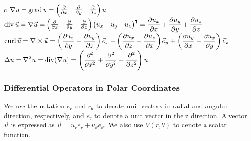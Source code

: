\documentclass{article}
\begin{document}
\begin{twocolumn}
\begin{center}
	\begin{mtabular}{c}
		$\displaystyle \nabla u = \operatorname{grad} u = \begin{pmatrix} \frac{\partial }{\partial x} & \frac{\partial }{\partial y} & \frac{\partial }{\partial z}  \end{pmatrix} u$ \\
		$\displaystyle \operatorname{div} \vec u = \nabla \vec u = \begin{pmatrix} \frac{\partial }{\partial x} & \frac{\partial }{\partial y} & \frac{\partial }{\partial z} \end{pmatrix} \begin{pmatrix} u_x & u_y & u_z	\end{pmatrix}^\intercal = \frac{\partial u_x}{\partial x} + \frac{\partial u_y}{\partial y} + \frac{\partial u_z}{\partial z}$\\
		$\displaystyle \operatorname{curl} \vec u = \nabla \times \vec u = \left( \frac{\partial u_z}{\partial y} - \frac{\partial u_y}{\partial z} \right) \vec e_x + \left( \frac{\partial u_x}{\partial z} - \frac{\partial u_z}{\partial x} \right) \vec e_y + \left( \frac{\partial u_y}{\partial x} - \frac{\partial u_x}{\partial y} \right) \vec e_z $\\
		$\displaystyle \Delta u = \nabla^2 u = \operatorname{div}(\nabla u) =  \left(\frac{\partial^2 }{\partial x ^2} + \frac{\partial^2 }{\partial y ^2} + \frac{\partial^2 }{\partial z ^2}\right) u$
	\end{mtabular}
\end{center}

\subsubsection{Differential Operators in Polar Coordinates}

We use the notation $e_r$ and $e_\theta$ to denote unit vectors in radial and angular direction, respectively, and $e_z$ to denote a unit vector in the z direction. A vector $\vec u$ is expressed as $\vec u = u_r e_r + u_\theta e_\theta$. We also use $V(r,\theta)$ to denote a scalar function.


\end{twocolumn}
\end{document}
